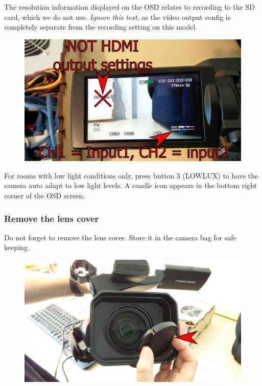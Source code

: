 \documentclass{article}
\begin{document}
The resolution information displayed on the OSD relates to recording to the SD card, which we do not use. \emph{Ignore this text}, as the video output config is completely separate from the recording setting on this model.
\begin{figure}[H]
  \centering
\includegraphics[width = 120mm]{Sony06.jpg}
\end{figure}

For rooms with low light conditions only, press button 3 (LOWLUX) to have the camera auto adapt to low light levels. A candle icon appears in the bottom right corner of the OSD screen.

\subsubsection{Remove the lens cover}
Do not forget to remove the lens cover. Store it in the camera bag for safe keeping.

\begin{figure}[H]
  \centering
\includegraphics[width = 120mm]{Sony07.jpg}
\end{figure}
\end{document}
